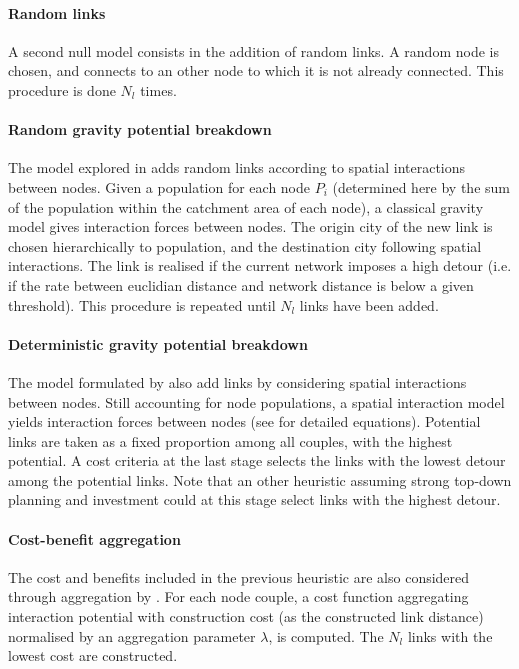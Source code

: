\documentclass{article}
\begin{document}
\paragraph{Random links}

A second null model consists in the addition of random links. A random node is chosen, and connects to an other node to which it is not already connected. This procedure is done $N_l$ times.


\paragraph{Random gravity potential breakdown}

The model explored in \cite{raimbault2020unveiling} adds random links according to spatial interactions between nodes. Given a population for each node $P_i$ (determined here by the sum of the population within the catchment area of each node), a classical gravity model gives interaction forces between nodes. The origin city of the new link is chosen hierarchically to population, and the destination city following spatial interactions. The link is realised if the current network imposes a high detour (i.e. if the rate between euclidian distance and network distance is below a given threshold). This procedure is repeated until $N_l$ links have been added.

\paragraph{Deterministic gravity potential breakdown}

The model formulated by \cite{raimbault2019second} also add links by considering spatial interactions between nodes. Still accounting for node populations, a spatial interaction model yields interaction forces between nodes (see \cite{raimbault2019second} for detailed equations). Potential links are taken as a fixed proportion among all couples, with the highest potential. A cost criteria at the last stage selects the links with the lowest detour among the potential links. Note that an other heuristic assuming strong top-down planning and investment could at this stage select links with the highest detour.


\paragraph{Cost-benefit aggregation}

The cost and benefits included in the previous heuristic are also considered through aggregation by \cite{louf2013emergence}. For each node couple, a cost function aggregating interaction potential with construction cost (as the constructed link distance) normalised by an aggregation parameter $\lambda$, is computed. The $N_l$ links with the lowest cost are constructed.
\end{document}
